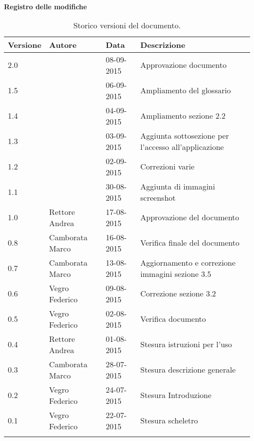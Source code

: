 \begin{Large}
	\textbf{Registro delle modifiche}
\end{Large}

\begin{longtable}{|l|l|l|p{}|}
\hline
\textbf{Versione} & \textbf{Autore} & \textbf{Data} & \textbf{Descrizione} \\
\hline
2.0 &  & 08-09-2015 & Approvazione documento \\
\hline
1.5 &  & 06-09-2015 & Ampliamento del glossario \\
\hline
1.4 &  & 04-09-2015 & Ampliamento sezione 2.2\\
\hline
1.3 &  & 03-09-2015 & Aggiunta sottosezione per l'accesso all'applicazione \\
\hline
1.2 &  & 02-09-2015 & Correzioni varie \\
\hline
1.1 &  & 30-08-2015 & Aggiunta di immagini screenshot \\
\hline
1.0 & Rettore Andrea & 17-08-2015 & Approvazione del documento \\
\hline
0.8 & Camborata Marco & 16-08-2015 & Verifica finale del documento \\
\hline
0.7 & Camborata Marco & 13-08-2015 & Aggiornamento e correzione immagini sezione 3.5 \\
\hline
0.6 & Vegro Federico & 09-08-2015 & Correzione sezione 3.2 \\
\hline
0.5 & Vegro Federico & 02-08-2015 & Verifica documento \\
\hline
0.4 & Rettore Andrea & 01-08-2015 & Stesura istruzioni per l'uso \\
\hline
0.3 & Camborata Marco & 28-07-2015 & Stesura descrizione generale \\
\hline
0.2 & Vegro Federico & 24-07-2015 & Stesura Introduzione \\
\hline
0.1 & Vegro Federico & 22-07-2015 & Stesura scheletro \\
\hline
\caption{Storico versioni del documento.}
\end{longtable}
